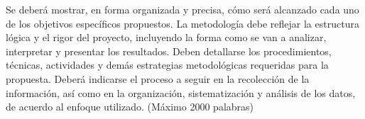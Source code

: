 \documentclass[../Main.tex]{subfiles}
\begin{document}
Se deberá mostrar, en forma organizada y precisa, cómo será alcanzado cada uno de los objetivos específicos propuestos. La metodología debe reflejar la estructura lógica y el rigor del proyecto, incluyendo la forma como se van a analizar, interpretar y presentar los resultados. Deben detallarse
los procedimientos, técnicas, actividades y demás estrategias metodológicas requeridas para la propuesta. Deberá indicarse el proceso a seguir en la recolección de la información, así como en la organización, sistematización y análisis de los datos, de acuerdo al enfoque utilizado.
(Máximo 2000 palabras)
\end{document}
